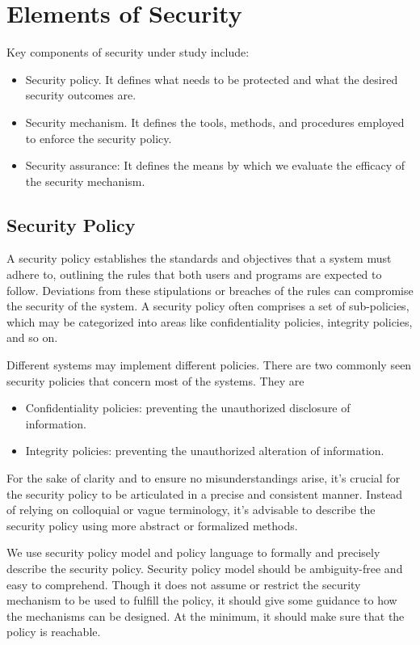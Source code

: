 \section{Elements of Security}

Key components of security under study include:
\begin{itemize}
	\item Security policy. It defines what needs to be protected and what the desired security outcomes are.
	\item Security mechanism. It defines the tools, methods, and procedures employed to enforce the security policy.
	\item Security assurance: It defines the means by which we evaluate the efficacy of the security mechanism.
\end{itemize}

\subsection{Security Policy}

A security policy establishes the standards and objectives that a system must adhere to, outlining the rules that both users and programs are expected to follow. Deviations from these stipulations or breaches of the rules can compromise the security of the system. A security policy often comprises a set of sub-policies, which may be categorized into areas like confidentiality policies, integrity policies, and so on.

Different systems may implement different policies. There are two commonly seen security policies that concern most of the systems. They are
\begin{itemize}
  \item Confidentiality policies: preventing the unauthorized disclosure of information.
  \item Integrity policies: preventing the unauthorized alteration of information.
\end{itemize}

For the sake of clarity and to ensure no misunderstandings arise, it's crucial for the security policy to be articulated in a precise and consistent manner. Instead of relying on colloquial or vague terminology, it's advisable to describe the security policy using more abstract or formalized methods. 

We use security policy model and policy language to formally and precisely describe the security policy. Security policy model should be ambiguity-free and easy to comprehend. Though it does not assume or restrict the security mechanism to be used to fulfill the policy, it should give some guidance to how the mechanisms can be designed. At the minimum, it should make sure that the policy is reachable.

